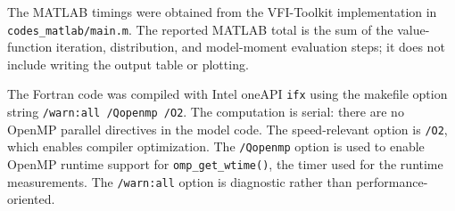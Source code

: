 \documentclass[11pt]{article}
\begin{document}
The MATLAB timings were obtained from the VFI-Toolkit implementation in
\texttt{codes\_matlab/main.m}. The reported MATLAB total is the sum of the
value-function iteration, distribution, and model-moment evaluation steps;
it does not include writing the output table or plotting.

The Fortran code was compiled with Intel oneAPI \texttt{ifx} using the
makefile option string \texttt{/warn:all /Qopenmp /O2}. The computation is
serial: there are no OpenMP parallel directives in the model code. The
speed-relevant option is \texttt{/O2}, which enables compiler optimization.
The \texttt{/Qopenmp} option is used to enable OpenMP runtime support for
\texttt{omp\_get\_wtime()}, the timer used for the runtime measurements.
The \texttt{/warn:all} option is diagnostic rather than performance-oriented.
\end{document}
